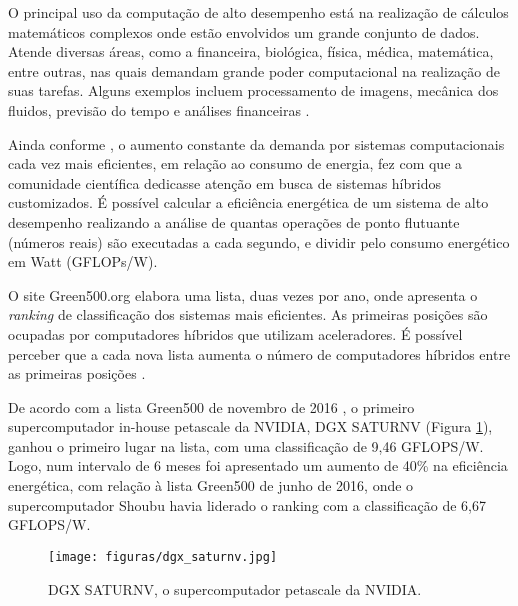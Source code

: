 \begin{citacao}
O principal uso da computação de alto desempenho está na realização de cálculos matemáticos complexos onde estão envolvidos um grande conjunto de dados. Atende diversas áreas, como a financeira, biológica, física, médica, matemática, entre outras, nas quais demandam grande poder computacional na realização de suas tarefas. Alguns exemplos incluem processamento de imagens, mecânica dos fluidos, previsão do tempo e análises financeiras \cite{eficiencia_comp}.
\end{citacao}

Ainda conforme \cite{eficiencia_comp}, o aumento constante da demanda por sistemas computacionais cada vez mais eficientes, em relação ao consumo de energia, fez com que a comunidade científica dedicasse atenção em busca de sistemas híbridos customizados. É possível calcular a eficiência energética de um sistema de alto desempenho realizando a análise de quantas operações de ponto flutuante (números reais) são executadas a cada segundo, e dividir pelo consumo energético em Watt (GFLOPs/W).

O site Green500.org elabora uma lista, duas vezes por ano, onde apresenta o \textit{ranking} de classificação dos sistemas mais eficientes. As primeiras posições são ocupadas por computadores híbridos que utilizam aceleradores. É possível perceber que a cada nova lista aumenta o número de computadores híbridos entre as primeiras posições \cite{eficiencia_comp}.

De acordo com a lista Green500 de novembro de 2016 \cite{green500}, o primeiro supercomputador in-house petascale da NVIDIA, DGX SATURNV (Figura \ref{fig:dgx-saturnv}), ganhou o primeiro lugar na lista, com uma classificação de 9,46 GFLOPS/W. Logo, num intervalo de 6 meses foi apresentado um aumento de 40\% na eficiência energética, com relação à lista Green500 de junho de 2016, onde o supercomputador Shoubu havia liderado o ranking com a classificação de 6,67 GFLOPS/W.

\begin{figure}[htb]
	\caption{\label{fig:dgx-saturnv} DGX SATURNV, o supercomputador petascale da NVIDIA.}
	\begin{center}
	    \texttt{[image: figuras/dgx\_saturnv.jpg]}
	\end{center}
\end{figure}